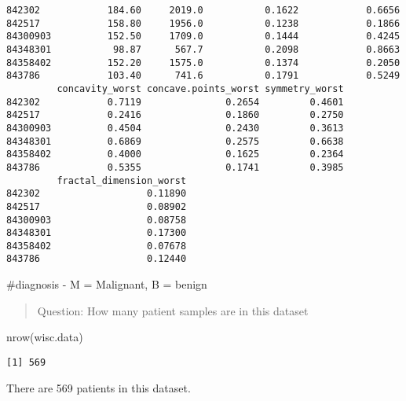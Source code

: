 \documentclass[
  letterpaper,
  DIV=11,
  numbers=noendperiod]{scrartcl}
\newenvironment{Shaded}{\begin{snugshade}}{\end{snugshade}}
\newcommand{\CommentTok}[1]{\textcolor[rgb]{0.37,0.37,0.37}{#1}}
\newcommand{\FunctionTok}[1]{\textcolor[rgb]{0.28,0.35,0.67}{#1}}
\newcommand{\NormalTok}[1]{\textcolor[rgb]{0.00,0.23,0.31}{#1}}
\begin{document}
\begin{verbatim}
842302            184.60     2019.0           0.1622            0.6656
842517            158.80     1956.0           0.1238            0.1866
84300903          152.50     1709.0           0.1444            0.4245
84348301           98.87      567.7           0.2098            0.8663
84358402          152.20     1575.0           0.1374            0.2050
843786            103.40      741.6           0.1791            0.5249
         concavity_worst concave.points_worst symmetry_worst
842302            0.7119               0.2654         0.4601
842517            0.2416               0.1860         0.2750
84300903          0.4504               0.2430         0.3613
84348301          0.6869               0.2575         0.6638
84358402          0.4000               0.1625         0.2364
843786            0.5355               0.1741         0.3985
         fractal_dimension_worst
842302                   0.11890
842517                   0.08902
84300903                 0.08758
84348301                 0.17300
84358402                 0.07678
843786                   0.12440
\end{verbatim}

\begin{Shaded}
\begin{Highlighting}[]
\CommentTok{\#diagnosis {-} M = Malignant, B = benign }
\end{Highlighting}
\end{Shaded}

\begin{quote}
Question: How many patient samples are in this dataset
\end{quote}

\begin{Shaded}
\begin{Highlighting}[]
\FunctionTok{nrow}\NormalTok{(wisc.data)}
\end{Highlighting}
\end{Shaded}

\begin{verbatim}
[1] 569
\end{verbatim}

There are 569 patients in this dataset.
\end{document}
